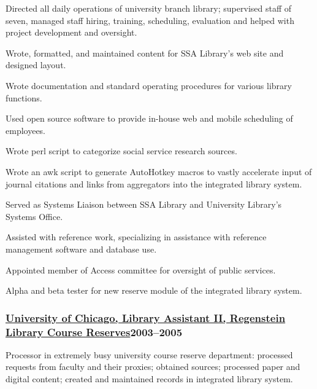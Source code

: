\documentclass[lettersize,12pt,]{article}
\begin{document}
Directed all daily operations of university branch library; supervised staff of seven, managed staff hiring, training, scheduling, evaluation and helped with project development and oversight.

\begin{compactitem}
\itemsep1pt\parskip0pt

\item Wrote, formatted, and maintained content for SSA Library’s web site and designed layout.

\item Wrote documentation and standard operating procedures for various library functions.

\item Used open source software to provide in-house web and mobile scheduling of employees.

\item Wrote perl script to categorize social service research sources.

\item Wrote an awk script to generate AutoHotkey macros to vastly accelerate input of journal citations and links from aggregators into the integrated library system.

\item Served as Systems Liaison between SSA Library and University Library’s Systems Office.

\item Assisted with reference work, specializing in assistance with reference management software and database use.

\item Appointed member of Access committee for oversight of public services.

\item Alpha and beta tester for new reserve module of the integrated library system.

\end{compactitem}



\subsubsection{\href{http://www.lib.uchicago.edu/e/using/reserve/}{University of Chicago, Library Assistant II, Regenstein Library Course Reserves}\hfill 2003--2005}

Processor in extremely busy university course reserve department: processed requests from faculty and their proxies; obtained sources; processed paper and digital content; created and maintained records in integrated library system.
\end{document}
